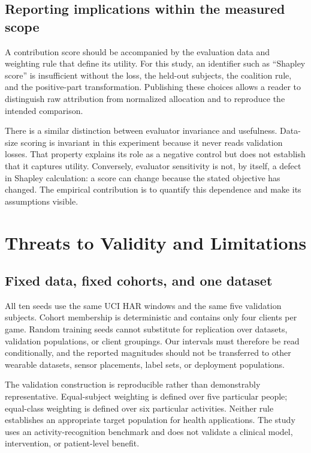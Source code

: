 \documentclass[conference,letterpaper]{IEEEtran}
\begin{document}
\subsection{Reporting implications within the measured scope}
A contribution score should be accompanied by the evaluation data and weighting rule that define its utility. For this study, an identifier such as ``Shapley score'' is insufficient without the loss, the held-out subjects, the coalition rule, and the positive-part transformation. Publishing these choices allows a reader to distinguish raw attribution from normalized allocation and to reproduce the intended comparison.

There is a similar distinction between evaluator invariance and usefulness. Data-size scoring is invariant in this experiment because it never reads validation losses. That property explains its role as a negative control but does not establish that it captures utility. Conversely, evaluator sensitivity is not, by itself, a defect in Shapley calculation: a score can change because the stated objective has changed. The empirical contribution is to quantify this dependence and make its assumptions visible.

\section{Threats to Validity and Limitations}
\subsection{Fixed data, fixed cohorts, and one dataset}
All ten seeds use the same UCI HAR windows and the same five validation subjects. Cohort membership is deterministic and contains only four clients per game. Random training seeds cannot substitute for replication over datasets, validation populations, or client groupings. Our intervals must therefore be read conditionally, and the reported magnitudes should not be transferred to other wearable datasets, sensor placements, label sets, or deployment populations.

The validation construction is reproducible rather than demonstrably representative. Equal-subject weighting is defined over five particular people; equal-class weighting is defined over six particular activities. Neither rule establishes an appropriate target population for health applications. The study uses an activity-recognition benchmark and does not validate a clinical model, intervention, or patient-level benefit.
\end{document}
